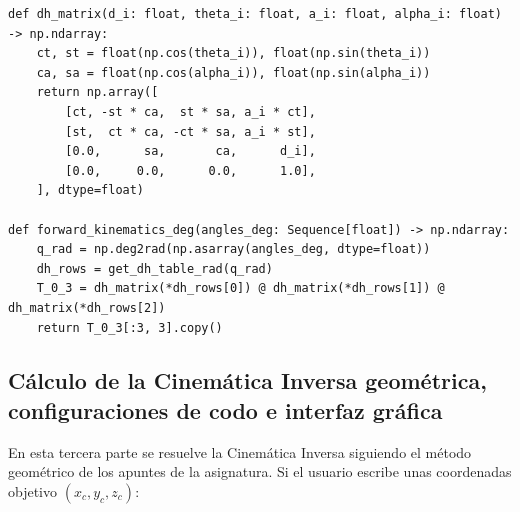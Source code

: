 \documentclass[11pt,a4paper]{article}
\begin{document}
\begin{lstlisting}[style=pythonstyle, caption={Cálculo de la Cinemática Directa por Denavit-Hartenberg en \texttt{src/kinematics.py}.}, label={lst:cd}]
def dh_matrix(d_i: float, theta_i: float, a_i: float, alpha_i: float) -> np.ndarray:
    ct, st = float(np.cos(theta_i)), float(np.sin(theta_i))
    ca, sa = float(np.cos(alpha_i)), float(np.sin(alpha_i))
    return np.array([
        [ct, -st * ca,  st * sa, a_i * ct],
        [st,  ct * ca, -ct * sa, a_i * st],
        [0.0,      sa,       ca,      d_i],
        [0.0,     0.0,      0.0,      1.0],
    ], dtype=float)

def forward_kinematics_deg(angles_deg: Sequence[float]) -> np.ndarray:
    q_rad = np.deg2rad(np.asarray(angles_deg, dtype=float))
    dh_rows = get_dh_table_rad(q_rad)
    T_0_3 = dh_matrix(*dh_rows[0]) @ dh_matrix(*dh_rows[1]) @ dh_matrix(*dh_rows[2])
    return T_0_3[:3, 3].copy()
\end{lstlisting}

\subsection{Cálculo de la Cinemática Inversa geométrica, configuraciones de codo e interfaz gráfica}
En esta tercera parte se resuelve la Cinemática Inversa siguiendo el método geométrico de los apuntes de la asignatura. Si el usuario escribe unas coordenadas objetivo $(x_c, y_c, z_c)$:
\end{document}
